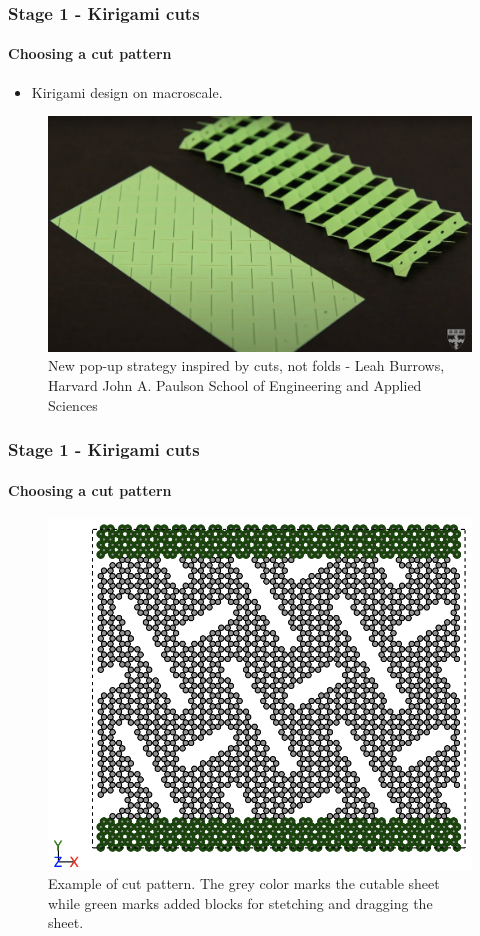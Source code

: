 \documentclass[
	10pt, %
]{beamer}
\begin{document}



\begin{frame}
	\frametitle{Stage 1 - Kirigami cuts}
	\framesubtitle{Choosing a cut pattern}

	\begin{itemize}
		\item Kirigami design on macroscale.
	\end{itemize}
	\begin{figure}
		\includegraphics[width=0.6\linewidth]{figures/kirigami_pattern_inspiration.png}
		\caption{New pop-up strategy inspired by cuts, not folds - Leah Burrows, Harvard John A. Paulson School of Engineering and Applied Sciences }
	\end{figure}	

	
\end{frame}


\begin{frame}
	\frametitle{Stage 1 - Kirigami cuts}
	\framesubtitle{Choosing a cut pattern}


	\begin{figure}
		\includegraphics[width=0.6\linewidth]{figures/cutpattern.png}
		\caption{Example of cut pattern. The grey color marks the cutable sheet while green marks added blocks for stetching and dragging the sheet.}
	\end{figure}	

\end{frame}
\end{document}
